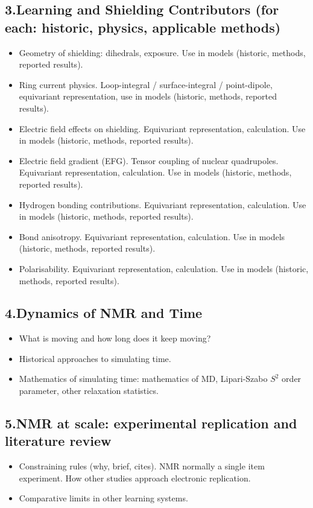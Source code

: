\documentclass[11pt,a4paper]{article}
\begin{document}
\subsection*{3.\quad Learning and Shielding Contributors (for each: historic, physics, applicable methods)}
\begin{itemize}
\item[a.] Geometry of shielding: dihedrals, exposure. Use in models (historic, methods, reported results).
\item[b.] Ring current physics. Loop-integral / surface-integral / point-dipole, equivariant representation, use in models (historic, methods, reported results).
\item[c.] Electric field effects on shielding. Equivariant representation, calculation. Use in models (historic, methods, reported results).
\item[d.] Electric field gradient (EFG). Tensor coupling of nuclear quadrupoles. Equivariant representation, calculation. Use in models (historic, methods, reported results).
\item[e.] Hydrogen bonding contributions. Equivariant representation, calculation. Use in models (historic, methods, reported results).
\item[f.] Bond anisotropy. Equivariant representation, calculation. Use in models (historic, methods, reported results).
\item[g.] Polarisability. Equivariant representation, calculation. Use in models (historic, methods, reported results).
\end{itemize}

\subsection*{4.\quad Dynamics of NMR and Time}
\begin{itemize}
\item[a.] What is moving and how long does it keep moving?
\item[b.] Historical approaches to simulating time.
\item[c.] Mathematics of simulating time: mathematics of MD, Lipari-Szabo $S^{2}$ order parameter, other relaxation statistics.
\end{itemize}

\subsection*{5.\quad NMR at scale: experimental replication and literature review}
\begin{itemize}
\item[a.] Constraining rules (why, brief, cites). NMR normally a single item experiment. How other studies approach electronic replication.
\item[b.] Comparative limits in other learning systems.
\end{itemize}
\end{document}
